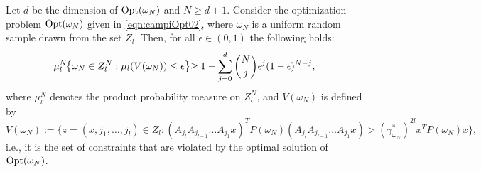\begin{theorem}\label{mainTheorem0}
Let $d$ be the dimension of $\text{Opt}(\omega_N)$ and $N \geq d+1$. Consider the optimization problem $\text{Opt}(\omega_N)$ given in \eqref{eqn:campiOpt02}, where $\omega_N$ is a uniform random sample drawn from the set $Z_l$.
Then, for all $\epsilon \in (0,1)$ the following holds:
\begin{equation}\label{eqn:violation}
\mu_l^N\hspace{-1mm}\left\{ \omega_N \in Z_l^N: \mu_l(V(\omega_N)) \leq \epsilon \right\}\hspace{-1mm} \geq 1- \sum_{j=0}^{d} \binom{N}{j}\epsilon^j (1-\epsilon)^{N-j},\end{equation}
where $\mu_l^N$ denotes the product probability measure on $Z_l^N$, and $V(\omega_N)$ is defined by 
$$V(\omega_N) := \{z=(x,j_{1},\dots,j_{l}) \in Z_l: (A_{j_l} A_{j_{l-1}} \dots A_{j_1} x)^T P(\omega_N)(A_{j_l} A_{j_{l-1}} \dots A_{j_1} x) > (\gamma_{\omega_N}^{*})^{2l} x^T P(\omega_N) x\},$$
i.e., it is the set of constraints that are violated by the optimal solution of $\text{Opt}(\omega_N)$.
\end{theorem}



